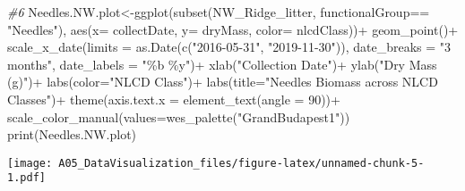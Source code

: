 \documentclass[
]{article}
\newenvironment{Shaded}{\begin{snugshade}}{\end{snugshade}}
\newcommand{\AttributeTok}[1]{\textcolor[rgb]{0.77,0.63,0.00}{#1}}
\newcommand{\CommentTok}[1]{\textcolor[rgb]{0.56,0.35,0.01}{\textit{#1}}}
\newcommand{\DecValTok}[1]{\textcolor[rgb]{0.00,0.00,0.81}{#1}}
\newcommand{\FunctionTok}[1]{\textcolor[rgb]{0.00,0.00,0.00}{#1}}
\newcommand{\NormalTok}[1]{#1}
\newcommand{\OtherTok}[1]{\textcolor[rgb]{0.56,0.35,0.01}{#1}}
\newcommand{\SpecialCharTok}[1]{\textcolor[rgb]{0.00,0.00,0.00}{#1}}
\newcommand{\StringTok}[1]{\textcolor[rgb]{0.31,0.60,0.02}{#1}}
\begin{document}
\begin{Shaded}
\begin{Highlighting}[]
\CommentTok{\#6}
\NormalTok{Needles.NW.plot}\OtherTok{\textless{}{-}}\FunctionTok{ggplot}\NormalTok{(}\FunctionTok{subset}\NormalTok{(NW\_Ridge\_litter, functionalGroup}\SpecialCharTok{==} \StringTok{"Needles"}\NormalTok{),}
                        \FunctionTok{aes}\NormalTok{(}\AttributeTok{x=}\NormalTok{ collectDate, }\AttributeTok{y=}\NormalTok{ dryMass, }\AttributeTok{color=}\NormalTok{ nlcdClass))}\SpecialCharTok{+}
                        \FunctionTok{geom\_point}\NormalTok{()}\SpecialCharTok{+}
                        \FunctionTok{scale\_x\_date}\NormalTok{(}\AttributeTok{limits =} \FunctionTok{as.Date}\NormalTok{(}\FunctionTok{c}\NormalTok{(}\StringTok{"2016{-}05{-}31"}\NormalTok{, }\StringTok{"2019{-}11{-}30"}\NormalTok{)), }
                        \AttributeTok{date\_breaks =} \StringTok{"3 months"}\NormalTok{, }\AttributeTok{date\_labels =} \StringTok{"\%b \%y"}\NormalTok{)}\SpecialCharTok{+}
                        \FunctionTok{xlab}\NormalTok{(}\StringTok{"Collection Date"}\NormalTok{)}\SpecialCharTok{+}
                        \FunctionTok{ylab}\NormalTok{(}\StringTok{"Dry Mass (g)"}\NormalTok{)}\SpecialCharTok{+}
                        \FunctionTok{labs}\NormalTok{(}\AttributeTok{color=}\StringTok{"NLCD Class"}\NormalTok{)}\SpecialCharTok{+}
                        \FunctionTok{labs}\NormalTok{(}\AttributeTok{title=}\StringTok{"Needles Biomass across NLCD Classes"}\NormalTok{)}\SpecialCharTok{+}
                        \FunctionTok{theme}\NormalTok{(}\AttributeTok{axis.text.x =} \FunctionTok{element\_text}\NormalTok{(}\AttributeTok{angle =} \DecValTok{90}\NormalTok{))}\SpecialCharTok{+}
                        \FunctionTok{scale\_color\_manual}\NormalTok{(}\AttributeTok{values=}\FunctionTok{wes\_palette}\NormalTok{(}\StringTok{"GrandBudapest1"}\NormalTok{))}
\FunctionTok{print}\NormalTok{(Needles.NW.plot)}
\end{Highlighting}
\end{Shaded}

\texttt{[image: A05\_DataVisualization\_files/figure-latex/unnamed-chunk-5-1.pdf]}
\end{document}
